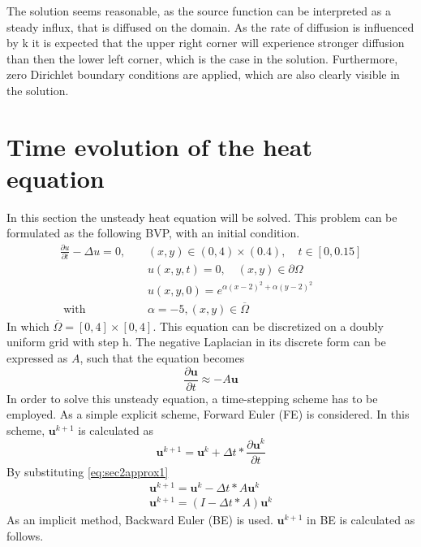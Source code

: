 \documentclass{article}
\begin{document}
The solution seems reasonable, as the source function can be interpreted as a steady influx, that is diffused on the domain. As the rate of diffusion is influenced by k it is expected that the upper right corner will experience stronger diffusion than then the lower left corner, which is the case in the solution. Furthermore, zero Dirichlet boundary conditions are applied, which are also clearly visible in the solution.

\section{Time evolution of the heat equation}
In this section the unsteady heat equation will be solved. This problem can be formulated as the following BVP, with an initial condition.
\begin{equation}
\begin{aligned} \frac{\partial u}{\partial t}-\Delta u=0,\;\;\;\;&(x, y) \in(0,4) \times(0.4), \quad t \in[0,0.15] \\ &u(x, y, t) =0, \quad(x, y) \in \partial \Omega \\ &u(x, y, 0) =e^{\alpha(x-2)^{2}+\alpha(y-2)^{2}} \\ \text { with } &\alpha=-5, (x, y) \in \overline{\Omega} \end{aligned}
\end{equation}
In which $\overline{\Omega} = \left[0,4\right] \times \left[0,4\right]$. This equation can be discretized on a doubly uniform grid with step h. The negative Laplacian in its discrete form can be expressed as $A$, such that the equation becomes
\begin{equation}
\frac{\partial \mathbf{u}}{\partial t}\approx-A\mathbf{u}
\label{eq:sec2approx1}
\end{equation}
In order to solve this unsteady equation, a time-stepping scheme has to be employed. As a simple explicit scheme, Forward Euler (FE) is considered. In this scheme, $\mathbf{u}^{k+1}$ is calculated as
\begin{equation}
\mathbf{u}^{k+1} = \mathbf{u}^{k}+\Delta t*\frac{\partial \mathbf{u}^k}{\partial t}
\end{equation}
By substituting \autoref{eq:sec2approx1}
\begin{align}
\mathbf{u}^{k+1} = \mathbf{u}^{k}-\Delta t*A\mathbf{u}^k\\
\mathbf{u}^{k+1} = (I-\Delta t*A)\mathbf{u}^k
\end{align}
As an implicit method, Backward Euler (BE) is used. $\mathbf{u}^{k+1}$ in BE is calculated as follows.
\end{document}
